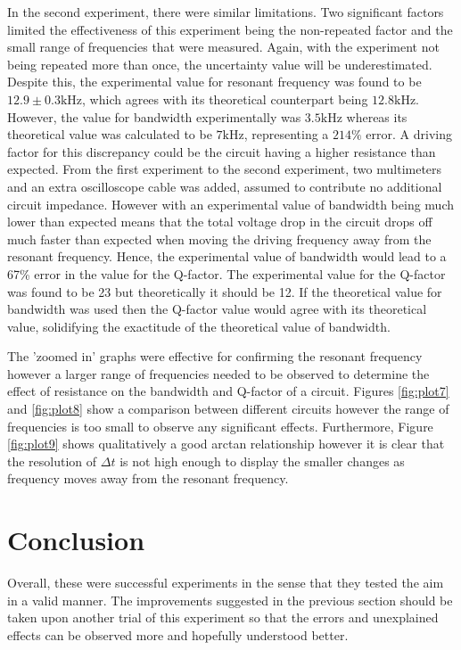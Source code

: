 \documentclass{article}
\begin{document}
In the second experiment, there were similar limitations. Two significant factors limited
the effectiveness of this experiment being the non-repeated factor and the small range 
of frequencies that were measured. Again, with the experiment not being repeated more than 
once, the uncertainty value will be underestimated. Despite this, the experimental value
for resonant frequency was found to be $12.9 \pm 0.3 \text{kHz}$, which agrees with its 
theoretical counterpart being $12.8 \text{kHz}$. However, the value for bandwidth experimentally
was $3.5 \text{kHz}$ whereas its theoretical value was calculated to be $7 \text{kHz}$, 
representing a $214\%$ error. A driving factor for this discrepancy could be the circuit having
a higher resistance than expected. From the first experiment to the second experiment, two
multimeters and an extra oscilloscope cable was added, assumed to contribute no additional 
circuit impedance. However with an experimental value of bandwidth being much lower than
expected means that the total voltage drop in the circuit drops off much faster than expected
when moving the driving frequency away from the resonant frequency. Hence, the experimental
value of bandwidth would lead to a 67\% error in the value for the Q-factor. The experimental
value for the Q-factor was found to be 23 but theoretically it should be 12. If the theoretical
value for bandwidth was used then the Q-factor value would agree with its theoretical value, 
solidifying the exactitude of the theoretical value of bandwidth.

The 'zoomed in' graphs were effective for confirming the resonant frequency however a 
larger range of frequencies needed to be observed to determine the effect of resistance
on the bandwidth and Q-factor of a circuit. Figures \ref{fig:plot7} and \ref{fig:plot8} show
a comparison between different circuits however the range of frequencies is too small to 
observe any significant effects. Furthermore, Figure \ref{fig:plot9} shows qualitatively a 
good arctan relationship however it is clear that the resolution of $\Delta t$ is not high
enough to display the smaller changes as frequency moves away from the resonant frequency.

\section{Conclusion}
Overall, these were successful experiments in the sense that they tested the aim in a valid 
manner. The improvements suggested in the previous section should be taken upon another trial
of this experiment so that the errors and unexplained effects can be observed more and hopefully
understood better.
\end{document}

